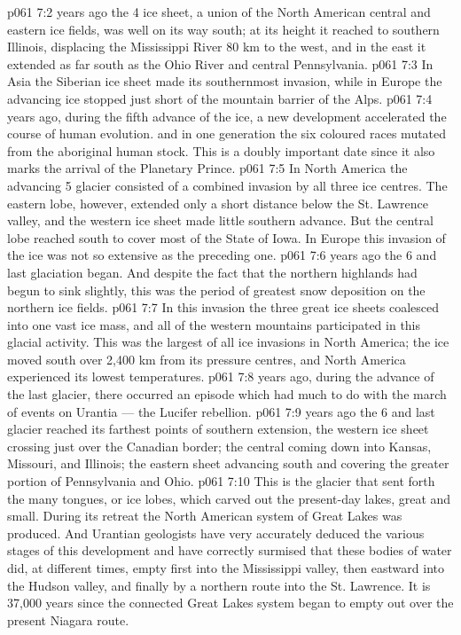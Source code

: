 \vs p061 7:2 \pc {} years ago the 4 ice sheet, a union of the North American central and eastern ice fields, was well on its way south; at its height it reached to southern Illinois, displacing the Mississippi River 80 km to the west, and in the east it extended as far south as the Ohio River and central Pennsylvania.
\vs p061 7:3 In Asia the Siberian ice sheet made its southernmost invasion, while in Europe the advancing ice stopped just short of the mountain barrier of the Alps.
\vs p061 7:4 \pc {} years ago, during the fifth advance of the ice, a new development accelerated the course of human evolution.  and in one generation the six coloured races mutated from the aboriginal human stock. This is a doubly important date since it also marks the arrival of the Planetary Prince.
\vs p061 7:5 In North America the advancing 5 glacier consisted of a combined invasion by all three ice centres. The eastern lobe, however, extended only a short distance below the St. Lawrence valley, and the western ice sheet made little southern advance. But the central lobe reached south to cover most of the State of Iowa. In Europe this invasion of the ice was not so extensive as the preceding one.
\vs p061 7:6 \pc {} years ago the 6 and last glaciation began. And despite the fact that the northern highlands had begun to sink slightly, this was the period of greatest snow deposition on the northern ice fields.
\vs p061 7:7 In this invasion the three great ice sheets coalesced into one vast ice mass, and all of the western mountains participated in this glacial activity. This was the largest of all ice invasions in North America; the ice moved south over 2,400 km from its pressure centres, and North America experienced its lowest temperatures.
\vs p061 7:8 \pc {} years ago, during the advance of the last glacier, there occurred an episode which had much to do with the march of events on Urantia --- the Lucifer rebellion.
\vs p061 7:9 \pc {} years ago the 6 and last glacier reached its farthest points of southern extension, the western ice sheet crossing just over the Canadian border; the central coming down into Kansas, Missouri, and Illinois; the eastern sheet advancing south and covering the greater portion of Pennsylvania and Ohio.
\vs p061 7:10 This is the glacier that sent forth the many tongues, or ice lobes, which carved out the present\hyp{}day lakes, great and small. During its retreat the North American system of Great Lakes was produced. And Urantian geologists have very accurately deduced the various stages of this development and have correctly surmised that these bodies of water did, at different times, empty first into the Mississippi valley, then eastward into the Hudson valley, and finally by a northern route into the St. Lawrence. It is 37,000 years since the connected Great Lakes system began to empty out over the present Niagara route.
